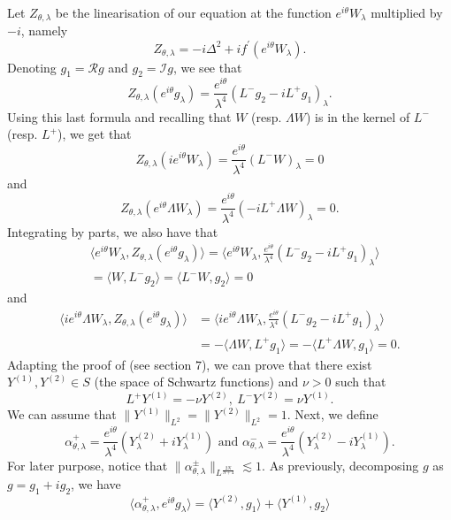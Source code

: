 \documentclass[a4paper,two-side,10pt]{amsart}
\numberwithin{equation}{section}
\begin{document}
Let $Z_{\theta ,\lambda}$ be the linearisation of our equation at the function $e^{i\theta} W_\lambda$ multiplied by $-i$, namely
$$Z_{\theta ,\lambda}=-i \Delta^2 +i f^\prime (e^{i\theta} W_\lambda ).$$
Denoting $g_1 = \mathcal{R} g$ and $g_2 =\mathcal{I} g$, we see that
$$Z_{\theta ,\lambda }(e^{i\theta} g_\lambda)= \frac{e^{i\theta}}{\lambda^4}(L^- g_2 - i L^+ g_1)_\lambda .$$
Using this last formula and recalling that $W$ (resp. $\Lambda W$) is in the kernel of $L^-$ (resp. $L^+$), we get that
$$Z_{\theta ,\lambda} (ie^{i\theta} W_\lambda )= \frac{e^{i\theta}}{\lambda^4} (L^- W)_\lambda =0$$
and
$$Z_{\theta ,\lambda} (e^{i\theta} \Lambda W_\lambda) = \frac{e^{i\theta}}{\lambda^4} (-i L^+ \Lambda W)_\lambda =0. $$
Integrating by parts, we also have that
\begin{align*}
&\langle e^{i\theta} W_\lambda , Z_{\theta ,\lambda} (e^{i\theta} g_\lambda)\rangle = \langle e^{i\theta} W_\lambda ,  \frac{e^{i\theta}}{\lambda^4}(L^- g_2 - i L^+ g_1)_\lambda \rangle \\
& =\langle W,L^- g_2\rangle = \langle L^- W ,g_2 \rangle =0
\end{align*}
and
\begin{align}
\label{ortZ}
\langle ie^{i\theta} \Lambda W_\lambda , Z_{\theta ,\lambda} (e^{i\theta} g_\lambda)\rangle &= \langle i  e^{i\theta} \Lambda W_\lambda ,  \frac{e^{i\theta}}{\lambda^4}(L^- g_2 - i L^+ g_1)_\lambda \rangle  \nonumber\\
&=-\langle \Lambda W,L^+ g_1\rangle = -\langle L^+ \Lambda W ,g_1 \rangle =0.
\end{align}
Adapting the proof of \cite{MR2491692} (see section $7$), we can prove that there exist $Y^{(1)} , Y^{(2)} \in S$ (the space of Schwartz functions) and $\nu >0$ such that
\begin{equation}
\label{defYs}
L^+ Y^{(1)} =-\nu Y^{(2)} ,\ L^- Y^{(2)} =\nu Y^{(1)} .
\end{equation}
We can assume that $\|Y^{(1)}\|_{L^2} =\|Y^{(2)}\|_{L^2}=1 $. Next, we define
$$\alpha_{\theta ,\lambda}^+ = \dfrac{e^{i\theta}}{\lambda^4} (Y_\lambda^{(2)} +i Y_\lambda^{(1)}) \text{ and } \alpha_{\theta ,\lambda}^- =  \dfrac{e^{i\theta}}{\lambda^4} (Y_\lambda^{(2)} - i Y_\lambda^{(1)}). $$
For later purpose, notice that $\|\alpha_{\theta ,\lambda}^\pm \|_{L^{\frac{2N}{N+4}}} \lesssim 1$.
As previously, decomposing $g$ as $g=g_1 +i g_2$, we have
\begin{equation}
\label{prelime1}
\langle \alpha_{\theta ,\lambda}^+ , e^{i\theta} g_\lambda \rangle = \langle Y^{(2)} ,g_1\rangle + \langle Y^{(1)} , g_2 \rangle 
\end{equation}
\end{document}
